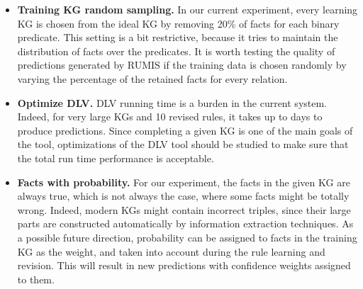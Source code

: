 \begin{itemize}
\item \textbf{Training KG random sampling.} In our current experiment, every learning KG is chosen from the ideal KG by removing 20\% of facts for each binary predicate. This setting is a bit restrictive, because it tries to maintain the distribution of facts over the predicates. It is worth testing the quality of predictions generated by RUMIS if the training data is chosen randomly by varying the percentage of the retained facts for every relation.
\item \textbf{Optimize DLV.} DLV running time is a burden in the current system. Indeed, for very large KGs and 10 revised rules, it takes up to days to produce predictions. Since completing a given KG is one of the main goals of the tool, optimizations of the DLV tool should be studied to make sure that the total run time performance is acceptable.
\item \textbf{Facts with probability.} For our experiment, the facts in the given KG are always true, which is not always the case, where some facts might be totally wrong. Indeed, modern KGs might contain incorrect triples, since their large parts are constructed automatically by information extraction techniques. As a possible future direction, probability can be assigned to facts in the training KG as the weight, and taken into account during the rule learning and revision. This will result in new predictions with confidence weights assigned to them.
\end{itemize}